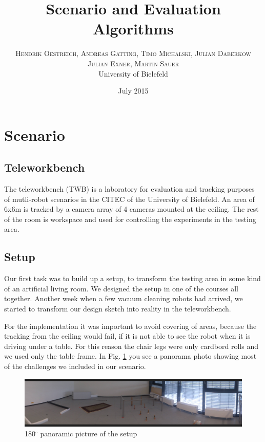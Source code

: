 \documentclass[twoside]{article}
\title{\vspace{-15mm}\fontsize{24pt}{10pt}\selectfont\textbf{Scenario and Evaluation Algorithms}} %
\author{
\large
\textsc{Hendrik Oestreich, Andreas Gatting, Timo Michalski, Julian Daberkow}\\
\textsc{Julian Exner, Martin Sauer}\\%
\normalsize University of Bielefeld \\ %
}
\date{July 2015}
\begin{document}
\maketitle %

\thispagestyle{fancy} %




\section{Scenario}
\subsection{Teleworkbench}
The teleworkbench (TWB) is a laboratory for evaluation and tracking purposes of mutli-robot scenarios in the CITEC of the University of Bielefeld. An area of 6x6m is tracked by a camera array of 4 cameras mounted at the ceiling. The rest of the room is workspace and used for controlling the experiments in the testing area. 

\subsection{Setup} %
Our first task was to build up a setup, to transform the testing area in some kind of an artificial living room. We designed the setup in one of the courses all together. Another week when a few vacuum cleaning robots had arrived, we started to transform our design sketch into reality in the teleworkbench.

For the implementation it was important to avoid covering of areas, because the tracking from the ceiling would fail, if it is not able to see the robot when it is driving under a table.
For this reason the chair legs were only cardbord rolls and we used only the table frame. In Fig. \ref{fig:panorama} you see a panorama photo showing most of the challenges we included in our scenario.

\begin{figure}[H]
	\centering
	\includegraphics[width=\textwidth]{pictures/Setup_panorama.JPG}
	\caption{180$^\circ$ panoramic picture of the setup}
	\label{fig:panorama}
\end{figure}
\end{document}
